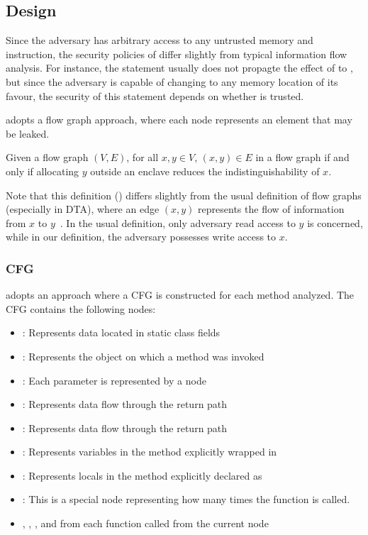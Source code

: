 \subsection{Design}\label{subsec:design}
Since the adversary has arbitrary access to any untrusted memory and instruction,
the security policies of \pname{} differ slightly from typical information flow analysis.
For instance, the statement  usually
does not propagte the effect of  to ,
but since the adversary is capable of changing  to any memory location of its favour,
the security of this statement depends on whether  is trusted.

\pname{} adopts a flow graph approach,
where each node represents an element that may be leaked.

\begin{defin}
	Given a flow graph $(V, E)$, for all $x, y \in V$,
	$(x, y) \in E$ in a flow graph if and only if
	allocating $y$ outside an enclave reduces the indistinguishability of $x$.
\end{defin}

Note that this definition () differs slightly from
the usual definition of flow graphs (especially in \ac{DTA}),
where an edge $(x, y)$ represents the flow of information from $x$ to $y$~\cite{YinHeng2007Pcsi}.
In the usual definition, only adversary read access to $y$ is concerned,
while in our definition, the adversary possesses write access to $x$.

\subsubsection{\acf{CFG}}
\pname{} adopts an approach where a \ac{CFG} is constructed for each method analyzed.
The \ac{CFG} contains the following nodes:
\begin{itemize}
	\item {}: Represents data located in static class fields
	\item {}: Represents the object on which a method was invoked
	\item {}: Each parameter is represented by a node
	\item {}: Represents data flow through the return path
	\item {}: Represents data flow through the return path
	\item {}: Represents variables in the method explicitly wrapped in 
	\item {}: Represents locals in the method explicitly declared as 
	\item {}: This is a special node representing how many times the function is called.
	\item {}, , ,  and 
		from each function called from the current node
\end{itemize}

